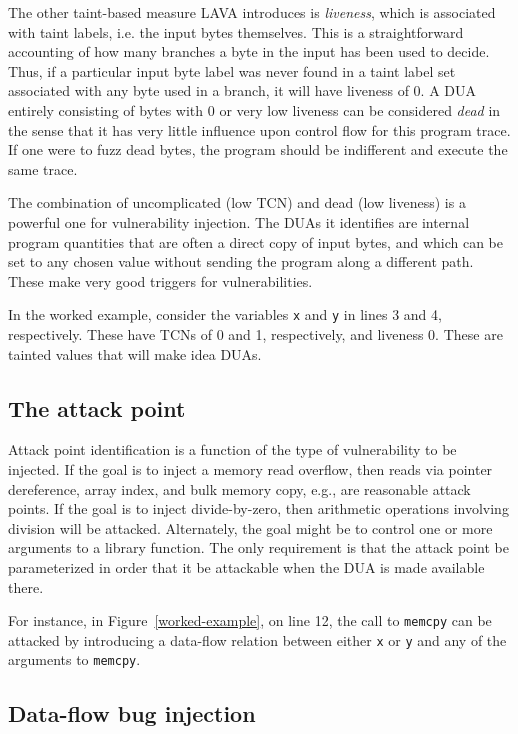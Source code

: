 

The other taint-based measure LAVA introduces is \emph{liveness}, which is associated with taint labels, i.e. the input bytes themselves.
This is a straightforward accounting of how many branches a byte in the input has been used to decide.
Thus, if a particular input byte label was never found in a taint label set associated with any byte used in a branch, it will have liveness of 0.
A DUA entirely consisting of bytes with 0 or very low liveness can be considered \emph{dead} in the sense that it has very little influence upon control flow for this program trace.
If one were to fuzz dead bytes, the program should be indifferent and execute the same trace.  

The combination of uncomplicated (low TCN) and dead (low liveness) is a powerful one for vulnerability injection.
The DUAs it identifies are internal program quantities that are often a direct copy of input bytes, and which can be set to any chosen value without sending the program along a different path.  
These make very good triggers for vulnerabilities.

In the worked example, consider the variables \verb+x+ and \verb+y+ in lines 3 and 4, respectively.
These have TCNs of 0 and 1, respectively, and liveness 0. 
These are tainted values that will make idea DUAs.

\subsection {The attack point}

Attack point identification is a function of the type of vulnerability to be injected.
If the goal is to inject a memory read overflow, then reads via pointer dereference, array index, and bulk memory copy, e.g., are reasonable attack points.  
If the goal is to inject divide-by-zero, then arithmetic operations involving division will be attacked. 
Alternately, the goal might be to control one or more arguments to a library function.
The only requirement is that the attack point be parameterized in order that it be attackable when the DUA is made available there. 

For instance, in Figure~\ref{worked-example}, on line 12, the call to \verb+memcpy+ can be attacked by introducing a data-flow relation between either \verb+x+ or \verb+y+ 
and any of the arguments to \verb+memcpy+.

\subsection {Data-flow bug injection}

